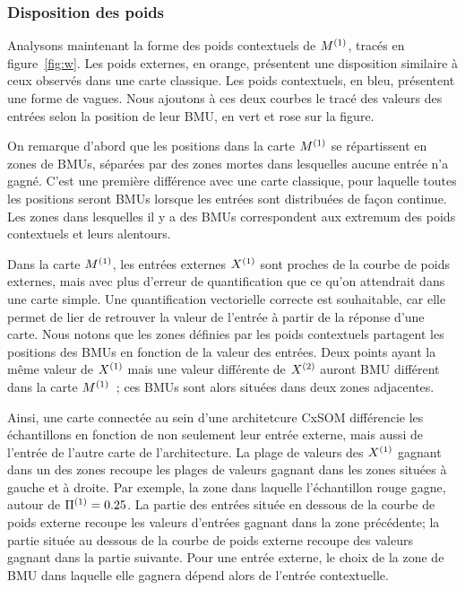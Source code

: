 \documentclass[../main]{subfiles}
\begin{document}
\subsubsection{Disposition des poids}

Analysons maintenant la forme des poids contextuels de $M^{({1})}$, tracés en figure~\ref{fig:w}.
Les poids externes, en orange, présentent une disposition similaire à ceux observés dans une carte classique. Les poids contextuels, en bleu, présentent une forme de vagues. Nous ajoutons à ces deux courbes le tracé des valeurs des entrées selon la position de leur BMU, en vert et rose sur la figure.

On remarque d'abord que les positions dans la carte $M^{({1})}$ se répartissent en zones de BMUs, séparées par des zones mortes dans lesquelles aucune entrée n'a gagné. 
C'est une première différence avec une carte classique, pour laquelle toutes les positions seront BMUs lorsque les entrées sont distribuées de façon continue.
Les zones dans lesquelles il y a des BMUs correspondent aux extremum des poids contextuels et leurs alentours.

Dans la carte $M^{({1})}$, les entrées externes $X^{({1})}$ sont proches de la courbe de poids externes, mais avec plus d'erreur de quantification que ce qu'on attendrait dans une carte simple. Une quantification vectorielle correcte est souhaitable, car elle permet de lier de retrouver la valeur de l'entrée à partir de la réponse d'une carte.
Nous notons que les zones définies par les poids contextuels partagent les positions des BMUs en fonction de la valeur des entrées. 
Deux points ayant la même valeur de $X^{({1})}$ mais une valeur différente de $X^{({2})}$ auront BMU différent dans la carte $M^{({1})}$~; ces BMUs sont alors situées dans deux zones adjacentes.

Ainsi, une carte connectée au sein d'une architetcure CxSOM différencie les échantillons en fonction de non seulement leur entrée externe, mais aussi de l'entrée de l'autre carte de l'architecture. La plage de valeurs des $X^{({1})}$ gagnant dans un des zones recoupe les plages de valeurs gagnant dans les zones situées à gauche et à droite. Par exemple, la zone dans laquelle l'échantillon rouge gagne, autour de $\Pi^{({1})} = 0.25$. La partie des entrées située en dessous de la courbe de poids externe recoupe les valeurs d'entrées gagnant dans la zone précédente; la partie située au dessous de la courbe de poids externe recoupe des valeurs gagnant dans la partie suivante. Pour une entrée externe, le choix de la zone de BMU dans laquelle elle gagnera dépend alors de l'entrée contextuelle. 
\end{document}

